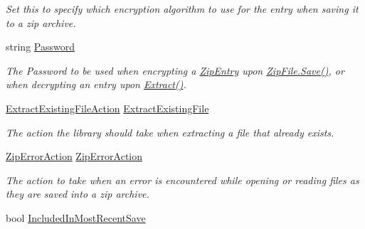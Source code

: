 \begin{DoxyCompactItemize}
\begin{DoxyCompactList}\small\item\em Set this to specify which encryption algorithm to use for the entry when saving it to a zip archive. \end{DoxyCompactList}\item 
string \mbox{\hyperlink{class_super_tiled2_unity_1_1_ionic_1_1_zip_1_1_zip_entry_a4e1ce23f98c2e3a60a2d47a25a243a82}{Password}}
\begin{DoxyCompactList}\small\item\em The Password to be used when encrypting a {\ttfamily \mbox{\hyperlink{class_super_tiled2_unity_1_1_ionic_1_1_zip_1_1_zip_entry}{Zip\+Entry}}} upon {\ttfamily \mbox{\hyperlink{class_super_tiled2_unity_1_1_ionic_1_1_zip_1_1_zip_file_aff8f1b3d07b66481e2629b04017a056f}{Zip\+File.\+Save()}}}, or when decrypting an entry upon \mbox{\hyperlink{class_super_tiled2_unity_1_1_ionic_1_1_zip_1_1_zip_entry_a9d65543aadd23e47e188175412891b42}{Extract()}}. \end{DoxyCompactList}\item 
\mbox{\hyperlink{namespace_super_tiled2_unity_1_1_ionic_1_1_zip_a3f8db7242d746d36b45114257b4fe4c0}{Extract\+Existing\+File\+Action}} \mbox{\hyperlink{class_super_tiled2_unity_1_1_ionic_1_1_zip_1_1_zip_entry_ad1ab903c29b91edb82e7c6a9768552dd}{Extract\+Existing\+File}}
\begin{DoxyCompactList}\small\item\em The action the library should take when extracting a file that already exists. \end{DoxyCompactList}\item 
\mbox{\hyperlink{namespace_super_tiled2_unity_1_1_ionic_1_1_zip_a5597d8881459658d304cdc5fdae35593}{Zip\+Error\+Action}} \mbox{\hyperlink{class_super_tiled2_unity_1_1_ionic_1_1_zip_1_1_zip_entry_a55a679298f00c5eef672e947c6293304}{Zip\+Error\+Action}}
\begin{DoxyCompactList}\small\item\em The action to take when an error is encountered while opening or reading files as they are saved into a zip archive. \end{DoxyCompactList}\item 
bool \mbox{\hyperlink{class_super_tiled2_unity_1_1_ionic_1_1_zip_1_1_zip_entry_aaf8218fe23c2cd0c0642858ce2f85087}{Included\+In\+Most\+Recent\+Save}}

\end{DoxyCompactItemize}
